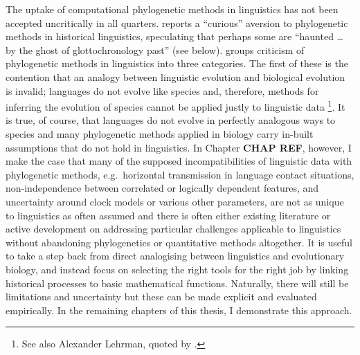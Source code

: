 The uptake of computational phylogenetic methods in linguistics has not been accepted uncritically in all quarters. \textcite[p.~520]{atkinson_curious_2005} reports a ``curious'' aversion to phylogenetic methods in historical linguistics, speculating that perhaps some are ``haunted \ldots{} by the ghost of glottochronology past'' (see below). \textcite{bowern_computational_2018} groups criticism of phylogenetic methods in linguistics into three categories. The first of these is the contention that an analogy between linguistic evolution and biological evolution is invalid; languages do not evolve like species and, therefore, methods for inferring the evolution of species cannot be applied justly to linguistic data \autocites{andersen_synchrony_2006}{blench_new_2015}\footnote{See also Alexander Lehrman, quoted by \textcite[p.~1326]{balter_search_2004}.}. It is true, of course, that languages do not evolve in perfectly analogous ways to species and many phylogenetic methods applied in biology carry in-built assumptions that do not hold in linguistics. In Chapter \textbf{CHAP REF}, however, I make the case that many of the supposed incompatibilities of linguistic data with phylogenetic methods, e.g.~horizontal transmission in language contact situations, non-independence between correlated or logically dependent features, and uncertainty around clock models or various other parameters, are not as unique to linguistics as often assumed and there is often either existing literature or active development on addressing particular challenges applicable to linguistics without abandoning phylogenetics or quantitative methods altogether. It is useful to take a step back from direct analogising between linguistics and evolutionary biology, and instead focus on selecting the right tools for the right job by linking historical processes to basic mathematical functions. Naturally, there will still be limitations and uncertainty but these can be made explicit and evaluated empirically. In the remaining chapters of this thesis, I demonstrate this approach.

